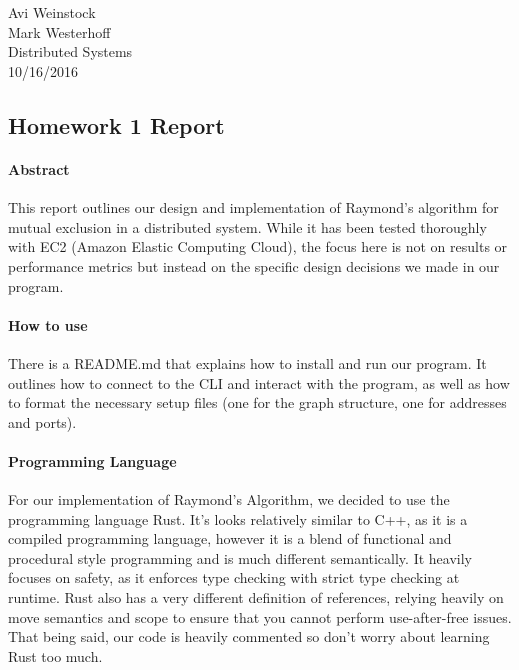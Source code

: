 \documentclass{article}
\begin{document}
\section*{}
Avi Weinstock \\
Mark Westerhoff \\
Distributed Systems\\
10/16/2016

\begin{center}
	\section*{Homework 1 Report}
\end{center}

\paragraph*{Abstract}
This report outlines our design and implementation of Raymond's algorithm for mutual exclusion in a distributed system. While it has been tested thoroughly with EC2 (Amazon Elastic Computing Cloud), the focus here is not on results or performance metrics but instead on the specific design decisions we made in our program.

\paragraph*{How to use}
There is a README.md that explains how to install and run our program. It outlines how to connect to the CLI and interact with the program, as well as how to format the necessary setup files (one for the graph structure, one for addresses and ports).

\paragraph*{Programming Language}
For our implementation of Raymond's Algorithm, we decided to use the programming language Rust. It's looks relatively similar to C++, as it is a compiled programming language, however it is a blend of functional and procedural style programming and is much different semantically. It heavily focuses on safety, as it enforces type checking with strict type checking at runtime. Rust also has a very different definition of references, relying heavily on move semantics and scope to ensure that you cannot perform use-after-free issues. That being said, our code is heavily commented so don't worry about learning Rust too much.
\end{document}
